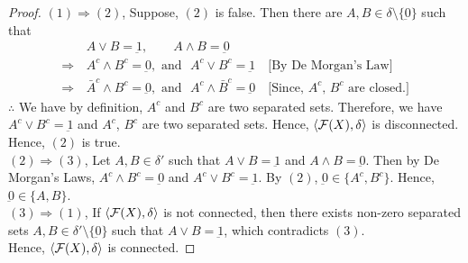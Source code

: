 \documentclass[../main-sheet.tex]{subfiles}
\begin{document}
\begin{proof}
    \((1)\Rightarrow(2)\), Suppose, \((2)\) is false. Then there are \(A, B\in\delta\setminus\{\underbar{0}\}\) such that 
    \begin{align*}
        &A\vee B=\underbar{1},\qquad A\wedge B=\underbar{0}\\
        \Rightarrow\,&A^c\wedge B^c=\underbar{0}, \text{ and }\,\, A^c\vee B^c=\underbar{1}\quad\text{[By De Morgan's Law]}\\
        \Rightarrow\,&\bar{A}^c\wedge B^c=\underbar{0}, \text{ and }\,\, A^c\wedge \bar{B}^c=\underbar{0}\quad\text{[Since, \(A^c \), \(B^c \) are closed.]}
    \end{align*}
    \(\therefore\) We have by definition, \(A^c \) and \(B^c \) are two separated sets. Therefore, we have \(A^c \vee B^c =\underbar{1}\) and \(A^c \), \(B^c \) are two separated sets. Hence, \(\langle \mathcal{F}(X), \delta \rangle\) is disconnected. Hence, \((2)\) is true.\\

    \((2)\Rightarrow(3)\), Let \(A,B\in \delta'\) such that \(A\vee B=\underbar{1}\) and \(A\wedge B=\underbar{0}\). Then by De Morgan's Laws, \(A^c \wedge B^c=\underbar{0}\) and \(A^c\vee B^c=\underbar{1}\). By \((2)\), \(\underbar{0}\in \{A^c,B^c \}\). Hence, \(\underbar{0}\in \{A,B \}\).\\

    \((3)\Rightarrow(1)\), If \(\langle \mathcal{F}(X), \delta \rangle\) is not connected, then there exists non-zero separated sets \(A,B\in \delta'\setminus\{\underbar{0}\}\) such that \(A\vee B=\underbar{1}\), which contradicts \((3)\).\\
    Hence, \(\langle \mathcal{F}(X), \delta \rangle\) is connected.
\end{proof}
\end{document}

